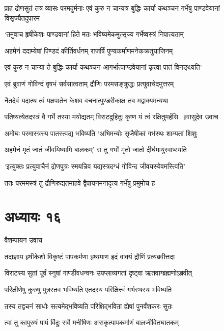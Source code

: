 प्राह द्रोणसुतं तत्र व्यासः परमदुर्मनाः
\twolineshloka
{एवं कुरु न चान्यत्र बुद्धिः कार्या कथञ्चन}
{गर्भेषु पाण्डवेयानां विसृज्यैतदुपारम}


\twolineshloka
{`तमुवाच हृषीकेशः पाण्डवानां हिते मतः}
{भविष्यमेकमुत्सृज्य गर्भेष्वस्त्रं निपात्यताम्}


\twolineshloka
{अहमेनं ददाम्येषां पिण्डदं कीर्तिवर्धनम्}
{राजर्षिं पुण्यकर्माणमनेकक्रतुयाजिनम्}


\twolineshloka
{एवं कुरु न चान्या ते बुद्धिः कार्या कथञ्चन}
{आगर्भात्पाण्डवेयानां कृत्वा पातं विनङ्क्ष्यति'}


\twolineshloka
{एवं ब्रुवाणं गोविन्दं वृषभं सर्वसात्वताम्}
{द्रौणिः परमसङ्क्रुद्धः प्रत्युवाचेदमुत्तरम्}


\twolineshloka
{नैतदेवं यदात्थ त्वं पक्षपातेन केशव}
{वचनात्पुण्डरीकाक्ष तव मद्वाक्यमन्यथा}


\threelineshloka
{पतिष्यत्येतदस्त्रं वै गर्भे तस्या मयोद्यतम्}
{विराटदुहितुः कृष्ण यं त्वं रक्षितुमर्हसि ॥वासुदेव उवाच}
{}


\twolineshloka
{अमोघः परमास्त्रस्य पातस्त्वद्य भविष्यति}
{`अभिमन्योः सृजैषीकां गर्भस्थः शाम्यतां शिशुः}


\twolineshloka
{अहमेनं मृतं जातं जीवयिष्यामि बालकम्'}
{स तु गर्भो मृतो जातो दीर्घमायुरवाप्स्यति}


\twolineshloka
{`इत्युक्तः प्रत्युवाचैनं द्रोणपुत्रः स्मयन्निव}
{यद्यस्त्रदग्धं गोविन्द जीवयस्येवमस्त्विति'}


\twolineshloka
{ततः परममस्त्रं तु द्रौणिरुद्यतमाहवे}
{द्वैपायनमनादृत्य गर्भेषु प्रमुमोच ह}


\chapter{अध्यायः १६}
\twolineshloka
{वैशम्पायन उवाच}
{}


\twolineshloka
{तदाज्ञाय हृषीकेशो विकृष्टं पापकर्मणा}
{हृष्यमाण इदं वाक्यं द्रौणिं प्रत्यब्रवीत्तदा}


\twolineshloka
{विराटस्य सुतां पूर्वं स्नुषां गाण्डीवधन्वनः}
{उपप्लाव्यगतां दृष्ट्वा ऋतवाग्ब्रह्मणोऽब्रवीत्}


\twolineshloka
{परिक्षीणेषु कुरुषु पुत्रस्तव भविष्यति}
{एतदस्य परिक्षित्त्वं गर्भस्थस्य भविष्यति}


\twolineshloka
{तस्य तद्वचनं साधोः सत्यमेद्भविष्यति}
{परिक्षिद्भविता ह्येषां पुनर्वंशकरः सुतः}


\twolineshloka
{त्वां तु कापुरुषं पापं विंदुः सर्वे मनीषिणः}
{असकृत्पापकर्माणं बालजीवितघातकम्}


